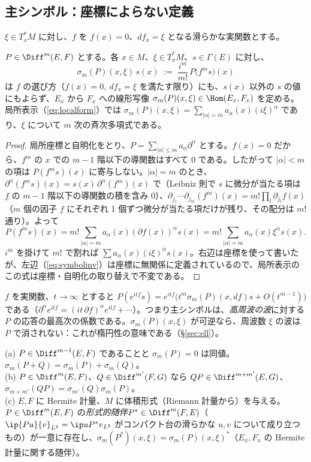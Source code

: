 \subsection{主シンボル：座標によらない定義}
$\xi\in T^*_xM$ に対し、$f$ を $f(x)=0$、$df_x=\xi$ となる滑らかな実関数とする。
\begin{thm}[主シンボル]\label{thm:symbol}\tP
$P\in\Diff^m(E,F)$ とする。各 $x\in M$、$\xi\in T^*_xM$、$s\in\Gamma(E)$ に対し、
\begin{equation}\label{eq:symbolinv}
\sigma_m(P)(x,\xi)\,s(x)\;:=\;\frac{i^m}{m!}\,P\bigl(f^m s\bigr)(x)
\end{equation}
は $f$ の選び方（$f(x)=0,\ df_x=\xi$ を満たす限り）にも、$s(x)$ 以外の $s$ の値にもよらず、$E_x$ から $F_x$ への線形写像 $\sigma_m(P)(x,\xi)\in\Hom(E_x,F_x)$ を定める。局所表示（\ref{eq:localform}）では $\sigma_m(P)(x,\xi)=\sum_{|\alpha|=m}a_\alpha(x)(i\xi)^\alpha$ であり、$\xi$ について $m$ 次の斉次多項式である。
\end{thm}
\begin{proof}
局所座標と自明化をとり、$P=\sum_{|\alpha|\le m}a_\alpha\partial^\alpha$ とする。$f(x)=0$ だから、$f^m$ の $x$ での $m-1$ 階以下の導関数はすべて $0$ である。したがって $|\alpha|<m$ の項は $P(f^ms)(x)$ に寄与しない。$|\alpha|=m$ のとき、$\partial^\alpha(f^ms)(x)=s(x)\,\partial^\alpha(f^m)(x)$ で（Leibniz 則で $s$ に微分が当たる項は $f$ の $m-1$ 階以下の導関数の積を含み $0$）、$\partial_{j_1}\cdots\partial_{j_m}(f^m)(x)=m!\prod_{l}\partial_{j_l}f(x)$（$m$ 個の因子 $f$ にそれぞれ 1 個ずつ微分が当たる項だけが残り、その配分は $m!$ 通り）。よって
\[
P(f^ms)(x)=m!\sum_{|\alpha|=m}a_\alpha(x)(\partial f(x))^\alpha s(x)=m!\sum_{|\alpha|=m}a_\alpha(x)\xi^\alpha s(x).
\]
$i^m$ を掛けて $m!$ で割れば $\sum a_\alpha(x)(i\xi)^\alpha s(x)$。右辺は座標を使って書いたが、左辺（\ref{eq:symbolinv}）は座標に無関係に定義されているので、局所表示のこの式は座標・自明化の取り替えで不変である。
\end{proof}
\begin{rem}[振動する関数による見方]
$f$ を実関数、$t\to\infty$ とすると $P(e^{itf}s)=e^{itf}\bigl(t^m\sigma_m(P)(x,df)s+O(t^{m-1})\bigr)$ である（$\partial^\alpha e^{itf}=(it\,\partial f)^\alpha e^{itf}+\cdots$）。つまり主シンボルは、\emph{高周波の波}に対する $P$ の応答の最高次の係数である。$\sigma_m(P)(x,\xi)$ が可逆なら、周波数 $\xi$ の波は $P$ で消されない：これが楕円性の意味である（\S\ref{sec:ell}）。
\end{rem}
\begin{prop}[シンボルの計算規則]\label{prop:symrules}\tP
(a) $P\in\Diff^{m-1}(E,F)$ であることと $\sigma_m(P)=0$ は同値。$\sigma_m(P+Q)=\sigma_m(P)+\sigma_m(Q)$。\\
(b) $P\in\Diff^m(E,F)$、$Q\in\Diff^{m'}(F,G)$ なら $QP\in\Diff^{m+m'}(E,G)$、$\sigma_{m+m'}(QP)=\sigma_{m'}(Q)\sigma_m(P)$。\\
(c) $E,F$ に Hermite 計量、$M$ に体積形式（Riemann 計量から）を与える。$P\in\Diff^m(E,F)$ の\emph{形式的随伴}$P^*\in\Diff^m(F,E)$（$\ip{Pu}{v}_{L^2}=\ip u{P^*v}_{L^2}$ がコンパクト台の滑らかな $u,v$ について成り立つもの）が一意に存在し、$\sigma_m(P^*)(x,\xi)=\sigma_m(P)(x,\xi)^*$（$E_x,F_x$ の Hermite 計量に関する随伴）。
\end{prop}
